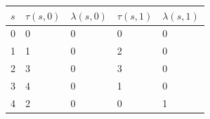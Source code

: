 \begin{tabular}{lllll}
\toprule
$s$ & $\tau(s,0)$ & $\lambda(s,0)$ & $\tau(s,1)$ & $\lambda(s,1)$ \\
\midrule
0 & 0 & 0 & 0 & 0 \\
1 & 1 & 0 & 2 & 0 \\
2 & 3 & 0 & 3 & 0 \\
3 & 4 & 0 & 1 & 0 \\
4 & 2 & 0 & 0 & 1 \\
\bottomrule
\end{tabular}
